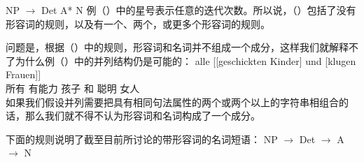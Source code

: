 \ea 
NP $\to$ Det A* N
\z
例（）中的星号\isce{*}{*}表示任意的迭代次数。所以说，（）包括了没有形容词的规则，以及有一个、两个，或更多个形容词的规则。

问题是，根据（）中的规则，形容词和名词并不组成一个成分，这样我们就解释不了为什么例（）中的并列结构仍是可能的：
\ea
\gll alle [[geschickten Kinder] und [klugen Frauen]]\\
	 所有  \spacebr{}\spacebr{}有能力 孩子 和  \spacebr{}聪明 女人\\
\z
如果我们假设并列需要把具有相同句法属性的两个或两个以上的字符串相组合的话，那么我们就不得不认为形容词和名词构成了一个成分。

%
下面的规则说明了截至目前所讨论的带形容词的名词短语：
\eal
\label{NP-Regeln}
\ex NP $\to$ Det \nbar
\ex\label{NP-Regeln-Adj} \nbar $\to$ A \nbar
\ex\label{NP-Regeln-Nbar-N} \nbar $\to$ N
\zl

